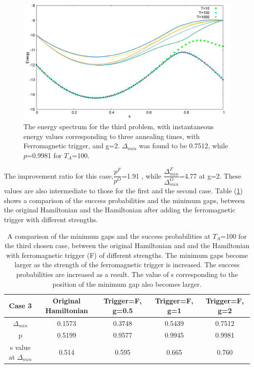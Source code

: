 \documentclass[12]{article}
\begin{document}
\begin{figure}[H]
\centering 
\includegraphics[scale=0.3]{528_s12_F_g2.png}
\caption{The energy spectrum for the third problem, with instantaneous energy values corresponding to three annealing times, with Ferromagnetic trigger, and g=2. $\Delta_{min}$ was found to be 0.7512, while $p$=0.9981 for $T_A$=100.}
\label{fig:f9}
\end{figure}
The improvement ratio for this case,$\dfrac{p^F}{p^O}$=1.91 , while $\dfrac{\Delta_{min}^F}{\Delta_{min}^O}$=4.77 at g=2. These values are also intermediate to those for the first and the second case.  Table (\ref{tab:f3}) shows a comparison of the success probabilities and the minimum gaps, between the original Hamiltonian and the Hamiltonian after adding the ferromagnetic trigger with different strengths.
\begin{table}
\centering
\renewcommand{\arraystretch}{1.8}
\begin{tabular}{|c|c|c|c|c|}
\hline 
Case 3 & Original Hamiltonian & Trigger=F, g=0.5 & Trigger=F, g=1 & Trigger=F, g=2 \\ 
\hline 
$\Delta_{min}$ & 0.1573 & 0.3748 & 0.5439 & 0.7512 \\ 
\hline 
p & 0.5199 & 0.9577 & 0.9945 & 0.9981 \\ 
\hline 
s value at $\Delta_{min}$ & 0.514 & 0.595 & 0.665 & 0.760 \\
\hline

\end{tabular} 
\caption{A comparison of the minimum gaps and the success probabilities at $T_A$=100 for the third chosen case, between the original Hamiltonian and and the Hamiltonian with ferromagnetic trigger (F) of different strengths. The minimum gaps become larger as the strength of the ferromagnetic trigger is increased. The success probabilities are increased as a result. The value of s corresponding to the position of the minimum gap also becomes larger.}
\label{tab:f3}
\end{table}
\\
\end{document}
